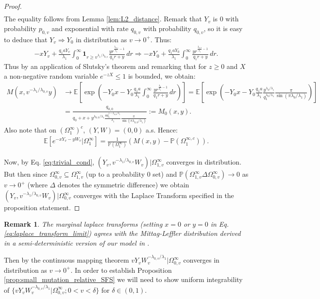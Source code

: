 \documentclass{article}
\numberwithin{equation}{section}
\newtheorem{remark}{Remark}
\begin{document}
\begin{proof}
\begin{align*}
\end{align*}
The equality follows from Lemma \ref{lem:L2_distance}. Remark that $Y_v$ is $0$ with probability $p_{0,v}$ and exponential with rate $q_{0,v}$ with probability $q_{0,v}$, so it is easy to deduce that $Y_v\Rightarrow Y_0$ in distribution as $v\to 0^+$. Thus:
\begin{align}
    -xY_v+\frac{q_1 aY_v}{\lambda_1}\int_{0}^\infty \mathbf{1}_{r\geq v^{\lambda_1/\lambda_{0,v}}}\frac{yr^{\frac{\lambda_{0,v}}{\lambda_1}-1}}{q_1 r+y}\,dr\Rightarrow -xY_0+\frac{q_1 a Y_0}{\lambda_1}\int_{0}^\infty \frac{yr^{\frac{\lambda_{0,0}}{\lambda_1}-1}}{q_1 r+y}\,dr.\label{eq:limit_laplace}
\end{align}
Thus by an application of Slutsky's theorem and remarking that for $z\geq 0$ and $X$ a non-negative random variable $e^{-zX}\leq 1$ is bounded, we obtain:
\begin{align}
  M(x,v^{-\lambda_1/\lambda_{0,v}}y)&\to \mathbb{E}\left[\exp\left(-Y_0x-Y_0\frac{q_1 a}{\lambda_1}\int_0^\infty\frac{yr^{\frac{\lambda_0}{\lambda_1}-1}}{q_1r+y}\,dr\right)\right]=\mathbb{E}\left[\exp\left(-Y_0x-Y_0\frac{q_1 a}{\lambda_1}\frac{y^{\lambda_0/\lambda_1}}{q_1^{\lambda_0/\lambda_1}}\frac{\pi}{\sin\left(\pi\lambda_0/\lambda_1\right)}\right)\right]\nonumber\\
  &=\frac{q_{0,0}}{q_0+x+y^{\lambda_{0,0}/\lambda_1}\frac{ aq_1 ^{1-\lambda_{0,0}/\lambda_1}}{\lambda_1}\frac{\pi}{\sin(\pi\lambda_{0,0}/\lambda_1)}}:=M_0(x,y).\nonumber
\end{align}
Also note that on $(\Omega_1^{\infty})^c$, $(Y,W)=(0,0)$ a.s. Hence:
\begin{align}
  \mathbb{E}[e^{-xY_v-yW_v}|\Omega_1^\infty]=\frac{1}{\mathbb{P}(\Omega_1^\infty)}\left(M(x,y)-\mathbb{P}(\Omega_1^{\infty,c})\right).\label{eq:trivial_cond}
\end{align}

Now, by Eq. \ref{eq:trivial_cond}, $(Y_v,v^{-\lambda_1/\lambda_{0,v}}W_v)|\Omega_{1,v}^\infty$ converges in distribution. But then since $\Omega_{0,v}^\infty\subseteq \Omega_{1,v}^\infty$ (up to a probability 0 set) and $\mathbb{P}(\Omega_{1,v}^\infty\Delta \Omega_{0,v}^\infty)\to 0$ as $v\to 0^+$ (where $\Delta$ denotes the symmetric difference) we obtain $(Y_v,v^{-\lambda_1/\lambda_{0,v}}W_v)|\Omega_{0,v}^\infty$ converges with the Laplace Transform specified in the proposition statement.

\end{proof}
\begin{remark}
  The marginal laplace transforms (setting $x=0$ or $y=0$ in Eq. \ref{eq:laplace_transform_limit}) agrees with the Mittag-Leffler distribution derived in a semi-deterministic version of our model in \cite{nicholson2023}.
\end{remark}
Then by the continuous mapping theorem $vY_v W_v^{-\lambda_{0,v}/\lambda_1}|\Omega_{0,v}^\infty$ converges in distribution as $v\to 0^+$. In order to establish Proposition \ref{prop:small_mutation_relative_SFS} we will need to show uniform integrability of  $\{vY_v W_v^{-\lambda_{0,v}/\lambda_1}|\Omega_{0,v}^\infty;0<v<\delta\}$ for $\delta\in (0,1).$
\end{document}

